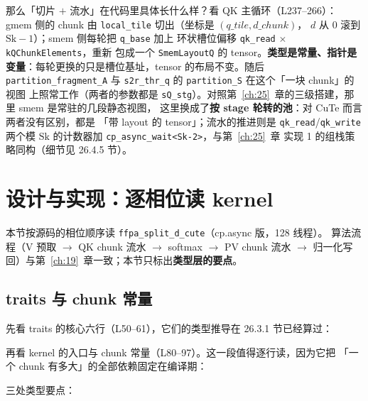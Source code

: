 那么「切片 $+$ 流水」在代码里具体长什么样？看 QK 主循环（L237--266）：
gmem 侧的 chunk 由 \texttt{local\_tile} 切出（坐标是 $(q\_tile, d\_chunk)$，
$d$ 从 $0$ 滚到 $\mathrm{Sk}{-}1$）；smem 侧每轮把 \texttt{q\_base} 加上
环状槽位偏移 \texttt{qk\_read} $\times$ \texttt{k\allowbreak{}QChunk\allowbreak{}Elements}，重新
包成一个 \texttt{SmemLayoutQ} 的 tensor。\textbf{类型是常量、指针是
变量}：每轮更换的只是槽位基址，tensor 的布局不变。随后 \texttt{partition\_\allowbreak{}fragment\_\allowbreak{}A} 与
\texttt{s2r\_thr\_q} 的 \texttt{partition\_S} 在这个「一块 chunk」的视图
上照常工作（两者的参数都是 \texttt{sQ\_stg}）。对照第~\ref{ch:25}~章的三级搭建，那里 smem 是常驻的几段静态视图，
这里换成了\textbf{按 stage 轮转的池}：对 CuTe 而言两者没有区别，都是
「带 layout 的 tensor」；流水的推进则是 \texttt{qk\_read}/\texttt{qk\_write}
两个模 $\mathrm{Sk}$ 的计数器加 \texttt{cp\_\allowbreak{}async\_\allowbreak{}wait\allowbreak{}<Sk-2>}，与第~\ref{ch:25}~章
实现 1 的组栈策略同构（细节见 26.4.5 节）。

\section{设计与实现：逐相位读 kernel}

本节按源码的相位顺序读 \texttt{ffpa\_\allowbreak{}split\_\allowbreak{}d\_\allowbreak{}cute}（cp.async 版，128 线程）。
算法流程（V 预取 $\to$ QK chunk 流水 $\to$ softmax $\to$ PV chunk 流水 $\to$
归一化写回）与第~\ref{ch:19}~章一致；本节只标出\textbf{类型层的要点}。

\subsection{traits 与 chunk 常量}

先看 traits 的核心六行（L50--61），它们的类型推导在 26.3.1 节已经算过：



再看 kernel 的入口与 chunk 常量（L80--97）。这一段值得逐行读，因为它把
「一个 chunk 有多大」的全部依赖固定在编译期：



三处类型要点：

